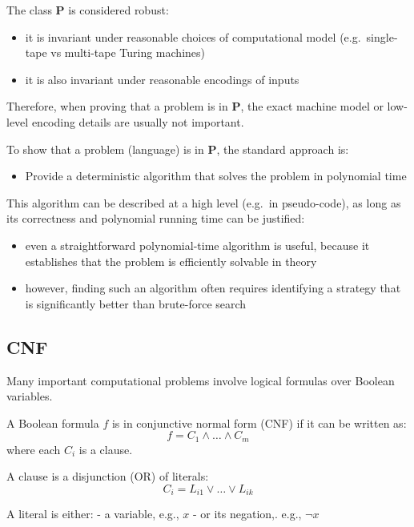 \documentclass[11pt]{article}
\providecommand{\tightlist}{%
      \setlength{\itemsep}{0pt}\setlength{\parskip}{0pt}}
\begin{document}
The class \textbf{P} is considered robust:

\begin{itemize}
\tightlist
\item
  it is invariant under reasonable choices of computational model
  (e.g.~single-tape vs multi-tape Turing machines)
\item
  it is also invariant under reasonable encodings of inputs
\end{itemize}

Therefore, when proving that a problem is in \textbf{P}, the exact
machine model or low-level encoding details are usually not important.

To show that a problem (language) is in \textbf{P}, the standard
approach is:

\begin{itemize}
\tightlist
\item
  Provide a deterministic algorithm that solves the problem in
  polynomial time
\end{itemize}

This algorithm can be described at a high level (e.g.~in pseudo-code),
as long as its correctness and polynomial running time can be justified:

\begin{itemize}
\tightlist
\item
  even a straightforward polynomial-time algorithm is useful, because it
  establishes that the problem is efficiently solvable in theory
\item
  however, finding such an algorithm often requires identifying a
  strategy that is significantly better than brute-force search
\end{itemize}

    \subsection{CNF}\label{cnf}

Many important computational problems involve logical formulas over
Boolean variables.

A Boolean formula \(f\) is in conjunctive normal form (CNF) if it can be
written as: \[
f = C_1 \land \ldots \land C_m
\] where each \(C_i\) is a clause.

A clause is a disjunction (OR) of literals: \[
C_i = L_{i1} \lor \ldots \lor L_{ik}
\]

A literal is either: - a variable, e.g., \(x\) - or its negation,. e.g.,
\(\neg x\)
\end{document}
